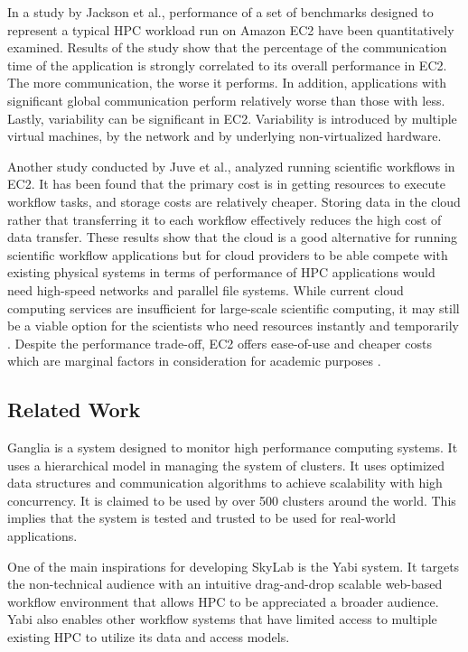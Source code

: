 \documentclass[journal]{./IEEE/IEEEtran}
\begin{document}
         In a study by Jackson et al.\cite{CloudCom2010}, performance of a set of benchmarks designed to represent a typical HPC workload run on Amazon EC2 have been quantitatively examined. Results of the study show that the percentage of the communication time of the application is strongly correlated to its overall performance in EC2. The more communication, the worse it performs. In addition, applications with significant global communication perform relatively worse than those with less. Lastly, variability can be significant in EC2. Variability is introduced by multiple virtual machines, by the network and by underlying non-virtualized hardware.

         Another study conducted by Juve et al.\cite{juve_scientific_2009}, analyzed running scientific workflows in EC2. It has been found that the primary cost is in getting resources to execute workflow tasks, and storage costs are relatively cheaper. Storing data in the cloud rather that transferring it to each workflow effectively reduces the high cost of data transfer. These results show that the cloud is a good alternative for running scientific workflow applications but for cloud providers to be able compete with existing physical systems in terms of performance of HPC applications would need high-speed networks and parallel file systems\cite{WalkerEC2HPC}. While current cloud computing services are insufficient for large-scale scientific computing, it may still be a viable option for the scientists who need resources instantly and temporarily \cite{PerfAnalysisManyTasks}. Despite the performance trade-off, EC2 offers ease-of-use and cheaper costs which are marginal factors in consideration for academic purposes \cite{ZachHumphrey}.
    \subsection {Related Work}
	    Ganglia is a system designed to monitor high performance computing systems. It uses a hierarchical model in managing the system of clusters. It uses optimized data structures and communication algorithms to achieve scalability with high concurrency. It is claimed to be used by over 500 clusters around the world. This implies that the system is tested and trusted to be used for real-world applications\cite{1395654820040701}.	    
	    
        One of the main inspirations for developing SkyLab is the Yabi system. It targets the non-technical audience with an intuitive drag-and-drop scalable web-based workflow environment that allows HPC to be appreciated a broader audience. Yabi also enables other workflow systems that have limited access to multiple existing HPC to utilize its data and access models\cite{7411021620120101}.
        
\end{document}

